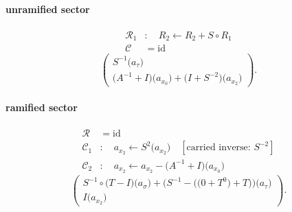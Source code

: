 \paragraph{unramified sector}
\[\begin{aligned}\mathcal R_{1}&:\quad R_2\leftarrow R_2+S\circ R_1\\\mathcal C&=\mathrm{id}\end{aligned}\]
\[\begin{pmatrix}S^{-1}\bigl(a_{\tau}\bigr)\\\bigl(A^{-1}+I\bigr)\bigl(a_{x_{0}}\bigr)+\bigl(I+S^{-2}\bigr)\bigl(a_{x_{2}}\bigr)\end{pmatrix}.\]
\paragraph{ramified sector}
\[\begin{aligned}\mathcal R&=\mathrm{id}\\\mathcal C_{1}&:\quad a_{x_{2}}\leftarrow S^{2}\bigl(a_{x_{2}}\bigr)\quad[\text{carried inverse: }S^{-2}]\\\mathcal C_{2}&:\quad a_{x_{2}}\leftarrow a_{x_{2}}-\bigl(A^{-1}+I\bigr)\bigl(a_{x_{0}}\bigr)\end{aligned}\]
\[\begin{pmatrix}S^{-1}\circ \bigl(T-I\bigr)\bigl(a_{\sigma}\bigr)+\bigl(S^{-1}-\bigl(\bigl(0+T^{0}\bigr)+T\bigr)\bigr)\bigl(a_{\tau}\bigr)\\I\bigl(a_{x_{2}}\bigr)\end{pmatrix}.\]
